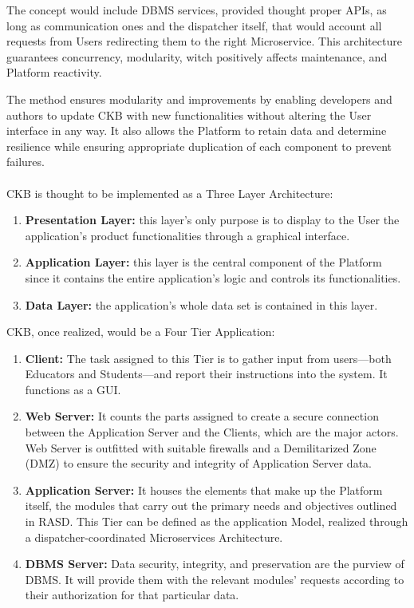 The concept would include DBMS services, provided thought proper APIs, as long as communication ones and the dispatcher itself, that would account all requests from Users redirecting them to the right Microservice. This architecture guarantees concurrency, modularity, witch positively affects maintenance, and Platform reactivity.

The method ensures modularity and improvements by enabling developers and authors to update CKB with new functionalities without altering the User interface in any way. 
It also allows the Platform to retain data and determine resilience while ensuring appropriate duplication of each component to prevent failures.\\
\\
CKB is thought to be implemented as a Three Layer Architecture:
\begin{enumerate}[label=$\bullet$]
    \item \textbf{Presentation Layer:} this layer's only purpose is to display to the User the application's product functionalities through a graphical interface.
    \item \textbf{Application Layer:} this layer is the central component of the Platform since it contains the entire application's logic and controls its functionalities.
    \item \textbf{Data Layer:} the application's whole data set is contained in this layer.
\end{enumerate}
CKB, once realized, would be a Four Tier Application:
\begin{enumerate}
    \item \textbf{Client:} The task assigned to this Tier is to gather input from users—both Educators and Students—and report their instructions into the system. It functions as a GUI.
    \item \textbf{Web Server:} It counts the parts assigned to create a secure connection between the Application Server and the Clients, which are the major actors. Web Server is outfitted with 
    suitable firewalls and a Demilitarized Zone (DMZ) to ensure the security and integrity of Application Server data.
    \item \textbf{Application Server:} It houses the elements that make up the Platform itself, the modules that carry out the primary needs and objectives outlined in RASD. This Tier can be 
    defined as the application Model, realized through a dispatcher-coordinated Microservices Architecture.
    \item \textbf{DBMS Server:} Data security, integrity, and preservation are the purview of DBMS. It will provide them with the relevant modules' requests according to their authorization for that particular data. 
\end{enumerate}
\newpage

